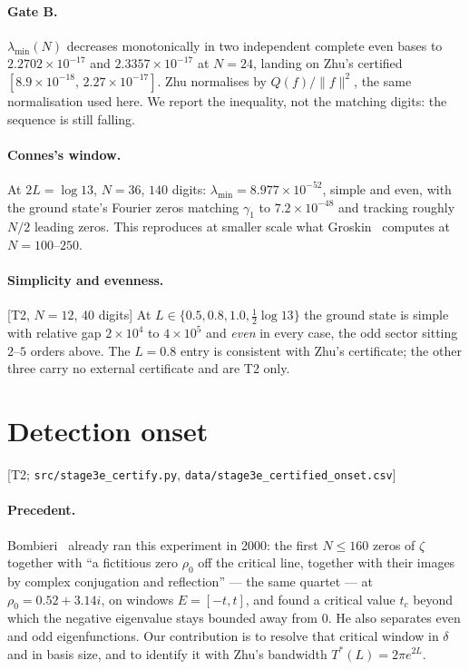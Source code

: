 \documentclass[11pt,a4paper]{article}
\theoremstyle{definition}
\theoremstyle{remark}
\newcommand{\tier}[1]{{\small\textsf{[#1]}}}
\newcommand{\lmin}{\lambda_{\min}}
\newcommand{\src}[1]{{\footnotesize\texttt{#1}}}
\begin{document}
\paragraph{Gate B.} $\lmin(N)$ decreases monotonically in two independent complete even
bases to $2.2702\times10^{-17}$ and $2.3357\times10^{-17}$ at $N=24$, landing on Zhu's
certified $[8.9\times10^{-18},\,2.27\times10^{-17}]$. Zhu normalises by $Q(f)/\|f\|^{2}$, the
same normalisation used here. We report the inequality, not the matching digits: the
sequence is still falling.

\paragraph{Connes's window.} At $2L=\log13$, $N=36$, $140$ digits:
$\lmin=8.977\times10^{-52}$, simple and even, with the ground state's Fourier zeros matching
$\gamma_1$ to $7.2\times10^{-48}$ and tracking roughly $N/2$ leading zeros. This reproduces
at smaller scale what Groskin~\cite{Groskin1} computes at $N=100$--$250$.

\paragraph{Simplicity and evenness.} \tier{T2, $N=12$, 40 digits} At
$L\in\{0.5,0.8,1.0,\tfrac12\log13\}$ the ground state is simple with relative gap
$2\times10^{4}$ to $4\times10^{5}$ and \emph{even} in every case, the odd sector sitting
$2$--$5$ orders above. The $L=0.8$ entry is consistent with Zhu's certificate; the other
three carry no external certificate and are T2 only.

\section{Detection onset}\label{sec:onset}
\tier{T2; \src{src/stage3e\_certify.py}, \src{data/stage3e\_certified\_onset.csv}}

\paragraph{Precedent.} Bombieri~\cite[\S13]{Bombieri} already ran this experiment in 2000:
the first $N\le160$ zeros of $\zeta$ together with ``a fictitious zero $\rho_0$ off the
critical line, together with their images by complex conjugation and reflection'' --- the
same quartet --- at $\rho_0=0.52+3.14i$, on windows $E=[-t,t]$, and found a critical value
$t_c$ beyond which the negative eigenvalue stays bounded away from $0$. He also separates
even and odd eigenfunctions. Our contribution is to resolve that critical window in
$\delta$ and in basis size, and to identify it with Zhu's bandwidth $T^{*}(L)=2\pi e^{2L}$.
\end{document}
